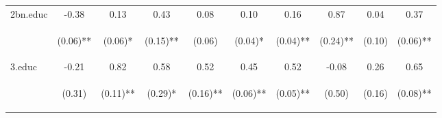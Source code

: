 \begin{center}
\begin{tabular}{lccccccccc}
\noalign{\smallskip}2bn.educ & -0.38 & 0.13 & 0.43 & 0.08 & 0.10 & 0.16 & 0.87 & 0.04 & 0.37\\
 & \begin{footnotesize}(0.06)**\end{footnotesize} & \begin{footnotesize}(0.06)*\end{footnotesize} & \begin{footnotesize}(0.15)**\end{footnotesize} & \begin{footnotesize}(0.06)\end{footnotesize} & \begin{footnotesize}(0.04)*\end{footnotesize} & \begin{footnotesize}(0.04)**\end{footnotesize} & \begin{footnotesize}(0.24)**\end{footnotesize} & \begin{footnotesize}(0.10)\end{footnotesize} & \begin{footnotesize}(0.06)**\end{footnotesize}\\
\noalign{\smallskip}3.educ & -0.21 & 0.82 & 0.58 & 0.52 & 0.45 & 0.52 & -0.08 & 0.26 & 0.65\\
 & \begin{footnotesize}(0.31)\end{footnotesize} & \begin{footnotesize}(0.11)**\end{footnotesize} & \begin{footnotesize}(0.29)*\end{footnotesize} & \begin{footnotesize}(0.16)**\end{footnotesize} & \begin{footnotesize}(0.06)**\end{footnotesize} & \begin{footnotesize}(0.05)**\end{footnotesize} & \begin{footnotesize}(0.50)\end{footnotesize} & \begin{footnotesize}(0.16)\end{footnotesize} & \begin{footnotesize}(0.08)**\end{footnotesize}\\

\end{tabular}
\end{center}

